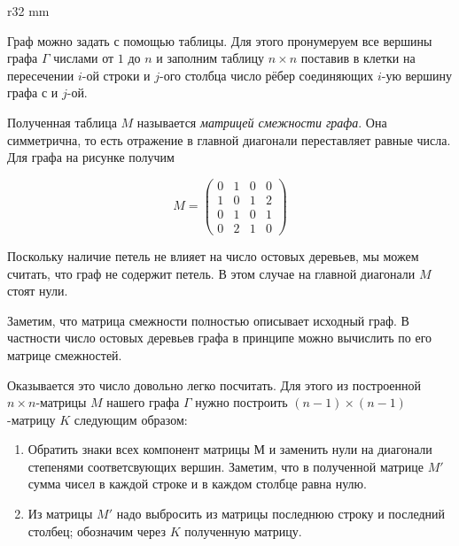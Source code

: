 \documentclass{article}
\begin{document}
{

\begin{wrapfigure}{r}{32 mm}
\end{wrapfigure}

Граф можно задать с помощью таблицы.
Для этого пронумеруем все вершины графа $\Gamma$ числами от $1$ до $n$ и заполним таблицу $n\times n$ поставив в клетки на пересечении $i$-ой строки и $j$-ого столбца число рёбер соединяющих $i$-ую вершину графа с и $j$-ой.

}

Полученная таблица $M$ называется \emph{матрицей смежности графа}.
Она симметрична, то есть отражение в главной диагонали переставляет равные числа.
Для графа на рисунке получим 

\[M=\left(
\begin{matrix}
0&1&0&0
\\
1&0&1&2
\\
0&1&0&1
\\
0&2&1&0
\end{matrix}
\right)\]

Поскольку наличие петель не влияет на число остовых деревьев, мы можем считать, что граф не содержит петель.
В этом случае на главной диагонали $M$ стоят нули.

Заметим, что матрица смежности полностью описывает исходный граф. 
В частности число остовых деревьев графа в принципе можно вычислить по его матрице смежностей.

Оказывается это число довольно легко посчитать.
Для этого из построенной $n\times n$-матрицы  $M$ нашего графа $\Gamma$ нужно построить $(n-1)\times(n-1)$-матрицу $K$ следующим образом: 

\begin{enumerate}
\item Обратить знаки всех компонент матрицы $М$ и заменить нули на диагонали степенями соответсвующих вершин. Заметим, что в полученной матрице $M'$ сумма чисел в каждой строке и в каждом столбце равна нулю. 
\item Из матрицы $M'$ надо выбросить из матрицы последнюю строку и последний столбец;
обозначим через $K$ полученную матрицу.
\end{enumerate}
\end{document}
